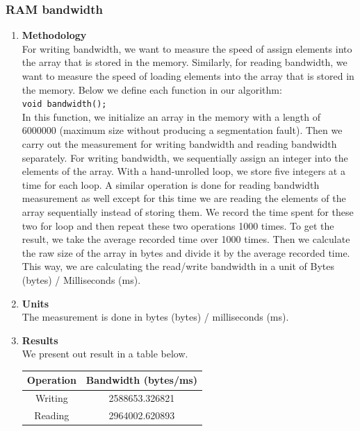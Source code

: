 \subsubsection{RAM bandwidth}
\begin{enumerate}[\bfseries (a), wide, labelwidth=!, labelindent=0pt]
    \item \textbf{Methodology}\\
    For writing bandwidth, we want to measure the speed of assign elements into the array that is stored in the memory. Similarly, for reading bandwidth, we want to measure the speed of loading elements into the array that is stored in the memory. Below we define each function in our algorithm:\\
    \hline \hline 
    \noindent\texttt{void bandwidth();}\\
    In this function, we initialize an array in the memory with a length of 6000000 (maximum size without producing a segmentation fault). Then we carry out the measurement for writing bandwidth and reading bandwidth separately. For writing bandwidth, we sequentially assign an integer into the elements of the array. With a hand-unrolled loop, we store five integers at a time for each loop. A similar operation is done for reading bandwidth measurement as well except for this time we are reading the elements of the array sequentially instead of storing them. We record the time spent for these two for loop and then repeat these two operations 1000 times. To get the result, we take the average recorded time over 1000 times. Then we calculate the raw size of the array in bytes and divide it by the average recorded time. This way, we are calculating the read/write bandwidth in a unit of Bytes (bytes) / Milliseconds (ms).
    \hline \hline 
    \item \textbf{Units}\\
    The measurement is done in bytes (bytes) / milliseconds (ms).
    \item \textbf{Results}\\
    We present out result in a table below.
    \begin{table}[h]
    \begin{tabular}{|c|c|}
    \hline
    \textbf{Operation} & \textbf{Bandwidth (bytes/ms)} \\ \hline
    Writing            & 2588653.326821                \\ \hline
    Reading            & 2964002.620893                \\ \hline
    \end{tabular}

\end{table}
\end{enumerate}
